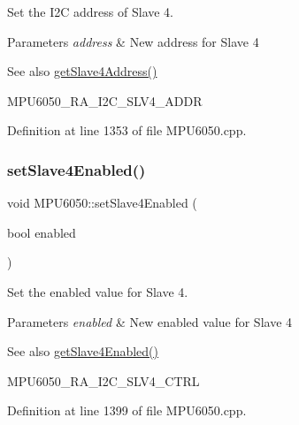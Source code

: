 Set the I2C address of Slave 4. 


\begin{DoxyParams}{Parameters}
{\em address} & New address for Slave 4 \\
\hline
\end{DoxyParams}
\begin{DoxySeeAlso}{See also}
\mbox{\hyperlink{classMPU6050_a4278dec5fec25be9a6f45b51a3373ad2}{get\+Slave4\+Address()}} 

M\+P\+U6050\+\_\+\+R\+A\+\_\+\+I2\+C\+\_\+\+S\+L\+V4\+\_\+\+A\+D\+DR 
\end{DoxySeeAlso}


Definition at line 1353 of file M\+P\+U6050.\+cpp.

\mbox{\label{classMPU6050_a04be2a8c3af6ef174f97769b9b5164a9}} 
\subsubsection{\texorpdfstring{setSlave4Enabled()}{setSlave4Enabled()}}
{\footnotesize\ttfamily void M\+P\+U6050\+::set\+Slave4\+Enabled (\begin{DoxyParamCaption}\item[{bool}]{enabled }\end{DoxyParamCaption})}



Set the enabled value for Slave 4. 


\begin{DoxyParams}{Parameters}
{\em enabled} & New enabled value for Slave 4 \\
\hline
\end{DoxyParams}
\begin{DoxySeeAlso}{See also}
\mbox{\hyperlink{classMPU6050_a4b9e13d6776ba99e042773873557bedd}{get\+Slave4\+Enabled()}} 

M\+P\+U6050\+\_\+\+R\+A\+\_\+\+I2\+C\+\_\+\+S\+L\+V4\+\_\+\+C\+T\+RL 
\end{DoxySeeAlso}


Definition at line 1399 of file M\+P\+U6050.\+cpp.

\mbox{\label{classMPU6050_a7d7498ebc26f8a1fe8c9dcf40cd5d265}} 
